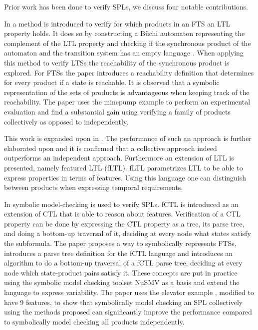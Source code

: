 Prior work has been done to verify SPLs, we discuss four notable contributions.

In \cite{CheckingLotsOfSystems} a method is introduced to verify for which products in an FTS an LTL property holds. It does so by constructing a B{\"u}chi automaton representing the complement of the LTL property and checking if the synchronous product of the automaton and the transition system has an empty language \cite{LTLusingAutomata}. When applying this method to verify LTSs the reachability of the synchronous product is explored. For FTSs the paper introduces a reachability definition that determines for every product if a state is reachable. It is observed that a symbolic representation of the sets of products is advantageous when keeping track of the reachability. The paper uses the minepump example \cite{Kramer1983CONICAI} to perform an experimental evaluation and find a substantial gain using verifying a family of products collectively as opposed to independently.

This work is expanded upon in \cite{FTSLTL}. The performance of such an approach is further elaborated upon and it is confirmed that a collective approach indeed outperforms an independent approach. Furthermore an extension of LTL is presented, namely featured LTL (fLTL). fLTL parametrizes LTL to be able to express properties in terms of features. Using this language one can distinguish between products when expressing temporal requirements.

In \cite{FTSCTL} symbolic model-checking is used to verify SPLs. fCTL is introduced as an extension of CTL that is able to reason about features. Verification of a CTL property can be done by expressing the CTL property as a tree, its parse tree, and doing a bottom-up traversal of it, deciding at every node what states satisfy the subformula. The paper proposes a way to symbolically represents FTSs, introduces a parse tree definition for the fCTL language and introduces an algorithm to do a bottom-up traversal of a fCTL parse tree, deciding at every node which state-product pairs satisfy it. These concepts are put in practice using the symbolic model checking toolset NuSMV \cite{NuSMV} as a basis and extend the language to express variability. The paper uses the elevator example \cite{PLATH200153}, modified to have 9 features, to show that symbolically model checking an SPL collectively using the methods proposed can significantly improve the performance compared to symbolically model checking all products independently.

